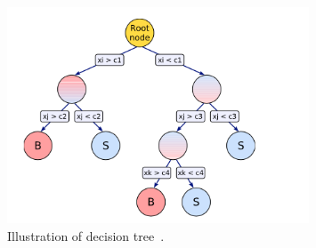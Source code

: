 
\begin{figure}
\begin{center}
\includegraphics[width=0.8\textwidth,keepaspectratio]{plots_and_figures/chapter5/decision_tree.png}
\caption{Illustration of decision tree~\cite{tmva_manual}.}
\label{fig:dec_tree}
\end{center}
\end{figure}


